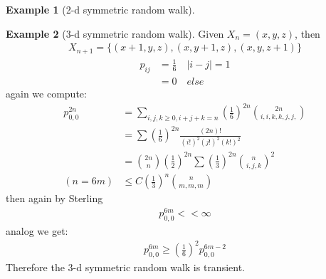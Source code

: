 \documentclass[a4paper,11pt]{book}
\theoremstyle{definition}
\newtheorem*{example}{Example}
\theoremstyle{remark}
\begin{document}
\begin{example}[2-d symmetric random walk]
\end{example}

\begin{example}[3-d symmetric random walk]
Given $X_n = (x, y, z)$, then
\begin{align*}
	X_{n+1} = \{(x+1, y, z), (x, y+1, z), (x, y, z+1)\}
\end{align*}	
\begin{align*}
	p_{ij} &= \frac{1}{6} \quad |i - j| = 1\\
	&= 0 \quad else
\end{align*}
again we compute:
\begin{align*}
	p^{2n}_{0,0} &= \sum_{ i, j, k \geq 0, i+j+k = n} (\frac{1}{6})^{2n} \binom{2n}{i, i, k, k , j, j, } \\
	&= \sum (\frac{1}{6})^{2n} \frac{(2n)!}{(i!)^2 (j!)^2 (k!)^2} \\
	&= \binom{2n}{n}(\frac{1}{2})^{2n} \sum (\frac{1}{3})^{2n} \binom{n}{i, j, k}^2\\
	( n = 6m)&\le C (\frac{1}{3})^n \binom{n}{m, m, m}
\end{align*}
then again by Sterling 
\begin{align*}
	p_{0, 0}^{6m} < < \infty
\end{align*}
analog we get:
\begin{align*}
	p^{6m}_{0, 0} \geq (\frac{1}{6})^2 p^{6m - 2}_{0,0}
\end{align*}
Therefore the 3-d symmetric random walk is transient.
\end{example}
\end{document}

